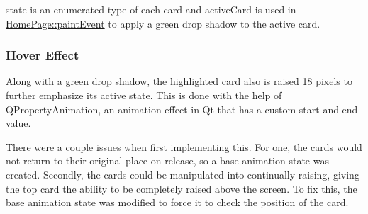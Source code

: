 \begin{DoxyCode}{0}
\DoxyCodeLine{\} \textcolor{keywordflow}{else} \{}
\DoxyCodeLine{\}}
\end{DoxyCode}


{\ttfamily state} is an enumerated type of each card and {\ttfamily active\+Card} is used in {\ttfamily \mbox{\hyperlink{classHomePage_ab3daab17f753e46efcec8968333f88b5}{Home\+Page\+::paint\+Event}}} to apply a green drop shadow to the active card.

\subsubsection*{Hover Effect}

Along with a green drop shadow, the highlighted card also is raised 18 pixels to further emphasize its active state. This is done with the help of Q\+Property\+Animation, an animation effect in Qt that has a custom start and end value.

There were a couple issues when first implementing this. For one, the cards would not return to their original place on release, so a base animation state was created. Secondly, the cards could be manipulated into continually raising, giving the top card the ability to be completely raised above the screen. To fix this, the base animation state was modified to force it to check the position of the card.

